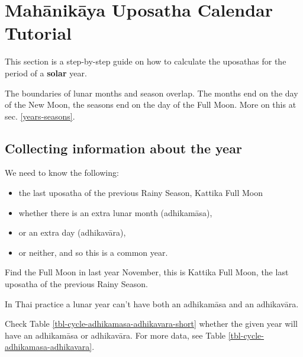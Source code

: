 \documentclass[11pt,oneside]{memoir-article}
\begin{document}
\mainmatter

\chapter{Mahānikāya Uposatha Calendar Tutorial}
\label{sec-2}
\label{uposatha-tutorial}

This section is a step-by-step guide on how to calculate the uposathas for the
period of a \textbf{solar} year.

The boundaries of lunar months and season overlap. The months end on the day of
the New Moon, the seasons end on the day of the Full Moon. More on this at sec.
\ref{years-seasons}.

\section{Collecting information about the year}
\label{sec-2-1}

We need to know the following:

\begin{itemize}
\item the last uposatha of the previous Rainy Season, Kattika Full Moon
\item whether there is an extra lunar month (adhikamāsa),
\item or an extra day (adhikavāra),
\item or neither, and so this is a common year.
\end{itemize}

Find the Full Moon in last year November, this is Kattika Full Moon, the last
uposatha of the previous Rainy Season.

In Thai practice a lunar year can't have both an adhikamāsa and an adhikavāra.

Check Table \ref{tbl-cycle-adhikamasa-adhikavara-short} whether the given year
will have an adhikamāsa or adhikavāra. For more data, see Table
\ref{tbl-cycle-adhikamasa-adhikavara}.
\end{document}
